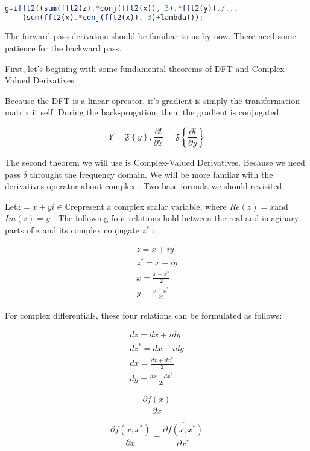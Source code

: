 \documentclass[11pt]{article}
\begin{document}
\begin{lstlisting}[language=Octave]

g=ifft2((sum(fft2(z).*conj(fft2(x)), 3).*fft2(y))./...
	(sum(fft2(x).*conj(fft2(x)), 3)+lambda)));

\end{lstlisting}

The forward pass derivation should be familiar to us by now. There need some 
patience for the backward pass.

First, let's begining with  some fundamental theorems of DFT and Complex-Valued Derivatives.

Because the DFT is a linear opreator, it's gradient is simply the transformation matrix it self. During the back-progation, then, the gradient is conjugated.\cite{SpectralPool}

$$
Y=\mathfrak{F}\left\{y\right\},\frac{\partial l}{\partial Y} = \mathfrak{F}\left\{\frac{\partial l}{\partial y}\right\}
$$


The second theorem we will use is Complex-Valued Derivatives\cite{Complexderivatives}. Because we need pass $\delta$ throught the frequency domain. We will be more familar with the derivatives operator about complex . Two base formula we should revisited.

Let$ z = x + yi \in \mathbb {C} $represent a complex scalar variable, where $ Re(z) = x $and $ Im(z) = y $ . The following four relations hold between the real and imaginary parts of z and its complex conjugate $ z^{*}$ :

\begin{eqnarray*}
z = x + iy\\
z^{*} = x - iy\\
x = \frac{x+x^{*}}{2}\\
y = \frac{x-x^{*}}{2i}
\end{eqnarray*}

For complex differentials, these four relations can be formulated as follows:

\begin{eqnarray*}
dz = dx + idy\\
dz^{*} = dx - idy\\
dx = \frac{dx+dx^{*}}{2}\\
dy = \frac{dx-dx^{*}}{2i}
\end{eqnarray*}

$$
\frac{\partial f(x)}{\partial x}
$$

$$
\frac{\partial f(x,x^{*})}{\partial x}=\overline{\frac{\partial f(x,x^{*})}{\partial x^{*}}}
$$
 
\end{document}
